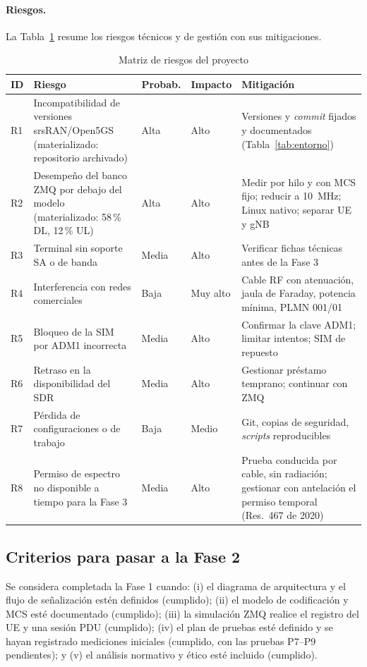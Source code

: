 \documentclass[conference]{IEEEtran}
\begin{document}
\paragraph{Riesgos.} La Tabla~\ref{tab:riesgos} resume los riesgos técnicos y de gestión con sus mitigaciones.

\begin{table}[!t]
\caption{Matriz de riesgos del proyecto}
\label{tab:riesgos}
\centering
\footnotesize
\renewcommand{\arraystretch}{1.15}
\begin{tabular}{p{0.8cm}p{5.3cm}p{1.6cm}p{1.6cm}p{6.5cm}}
\toprule
\textbf{ID} & \textbf{Riesgo} & \textbf{Probab.} & \textbf{Impacto} & \textbf{Mitigación} \\
\midrule
R1 & Incompatibilidad de versiones srsRAN/Open5GS (materializado: repositorio archivado) & Alta & Alto & Versiones y \textit{commit} fijados y documentados (Tabla~\ref{tab:entorno}) \\
R2 & Desempeño del banco ZMQ por debajo del modelo (materializado: 58\,\% DL, 12\,\% UL) & Alta & Alto & Medir por hilo y con MCS fijo; reducir a 10~MHz; Linux nativo; separar UE y gNB \\
R3 & Terminal sin soporte SA o de banda & Media & Alto & Verificar fichas técnicas antes de la Fase 3 \\
R4 & Interferencia con redes comerciales & Baja & Muy alto & Cable RF con atenuación, jaula de Faraday, potencia mínima, PLMN 001/01 \\
R5 & Bloqueo de la SIM por ADM1 incorrecta & Media & Alto & Confirmar la clave ADM1; limitar intentos; SIM de repuesto \\
R6 & Retraso en la disponibilidad del SDR & Media & Alto & Gestionar préstamo temprano; continuar con ZMQ \\
R7 & Pérdida de configuraciones o de trabajo & Baja & Medio & Git, copias de seguridad, \textit{scripts} reproducibles \\
R8 & Permiso de espectro no disponible a tiempo para la Fase 3 & Media & Alto & Prueba conducida por cable, sin radiación; gestionar con antelación el permiso temporal (Res.~467 de 2020) \\
\bottomrule
\end{tabular}
\end{table}

\subsection{Criterios para pasar a la Fase 2}
Se considera completada la Fase 1 cuando: (i) el diagrama de arquitectura y el flujo de señalización estén definidos (cumplido); (ii) el modelo de codificación y MCS esté documentado (cumplido); (iii) la simulación ZMQ realice el registro del UE y una sesión PDU (cumplido); (iv) el plan de pruebas esté definido y se hayan registrado mediciones iniciales (cumplido, con las pruebas P7--P9 pendientes); y (v) el análisis normativo y ético esté incluido (cumplido).
\end{document}
